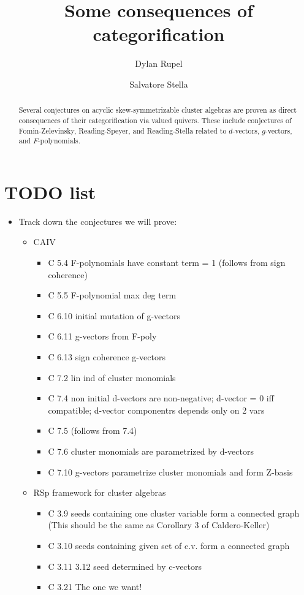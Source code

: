 \documentclass{amsart}
\title{Some consequences of categorification}
\author[Rupel]{Dylan Rupel}
\author[Stella]{Salvatore Stella}
\begin{document}
  \begin{abstract}
    Several conjectures on acyclic skew-symmetrizable cluster algebras are proven as direct consequences of their categorification via valued quivers.  These include conjectures of Fomin-Zelevinsky, Reading-Speyer, and Reading-Stella related to $d$-vectors, $g$-vectors, and $F$-polynomials.
  \end{abstract}
  \maketitle

  \section{TODO list}
  \begin{itemize}
    \item
      Track down the conjectures we will prove:
		
		\begin{itemize}
		  \item CAIV
        \begin{itemize}
          \item C 5.4	F-polynomials have constant term = 1 (follows from sign coherence)
          \item C 5.5	F-polynomial max deg term
          \item C 6.10	initial mutation of g-vectors
          \item C 6.11	g-vectors from F-poly
          \item C 6.13	sign coherence g-vectors
          \item C 7.2	lin ind of cluster monomials
          \item C 7.4	non initial d-vectors are non-negative; d-vector = 0 iff compatible; 	d-vector componentrs depends only on 2 vars
          \item C 7.5	(follows from 7.4)
          \item C 7.6	cluster monomials are parametrized by d-vectors
          \item C 7.10	g-vectors parametrize cluster monomials and form Z-basis
        \end{itemize}
      
      \item RSp framework for cluster algebras
        \begin{itemize}
          \item   C 3.9		seeds containing one cluster variable form a connected graph  (This should be the same as Corollary 3 of Caldero-Keller)
          \item   C 3.10		seeds containing given set of c.v. form a connected graph
          \item   C 3.11 3.12	seed determined by c-vectors
          \item   C 3.21		The one we want!
        \end{itemize}
    \end{itemize}



\end{itemize}
\end{document}
